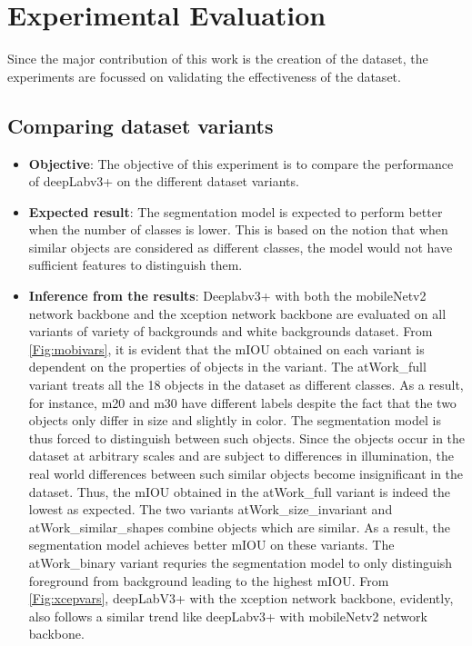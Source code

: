 
\chapter{Experimental Evaluation}

Since the major contribution of this work is the creation of the dataset, the experiments are focussed on validating the effectiveness of the dataset. 


\section{Comparing dataset variants} 

	\begin{itemize}
		\item \textbf{Objective}: The objective of this experiment is to compare the performance of deepLabv3+ on the different dataset variants.
		\item \textbf{Expected result}: The segmentation model is expected to perform better when the number of classes is lower. This is based on the notion that when similar objects are considered as different classes, the model would not have sufficient features to distinguish them.
		\item \textbf{Inference from the results}: Deeplabv3+ with both the mobileNetv2 network backbone and the xception network backbone are evaluated on all variants of variety of backgrounds and white backgrounds dataset. From \ref{Fig:mobivars}, it is evident that the mIOU obtained on each variant is dependent on the properties of objects in the variant. The atWork\_full variant treats all the 18 objects in the dataset as different classes. As a result, for instance, m20 and m30 have different labels despite the fact that the two objects only differ in size and slightly in color. The segmentation model is thus forced to distinguish between such objects. Since the objects occur in the dataset at arbitrary scales and are subject to differences in illumination, the real world differences between such similar objects become insignificant in the dataset. Thus, the mIOU obtained in the atWork\_full variant is indeed the lowest as expected. The two variants atWork\_size\_invariant and atWork\_similar\_shapes combine objects which are similar. As a result, the segmentation model achieves better mIOU on these variants. The atWork\_binary variant requries the segmentation model to only distinguish foreground from background leading to the highest mIOU. From \ref{Fig:xcepvars}, deepLabV3+ with the xception network backbone, evidently, also follows a similar trend like deepLabv3+ with mobileNetv2 network backbone.
	\end{itemize}

